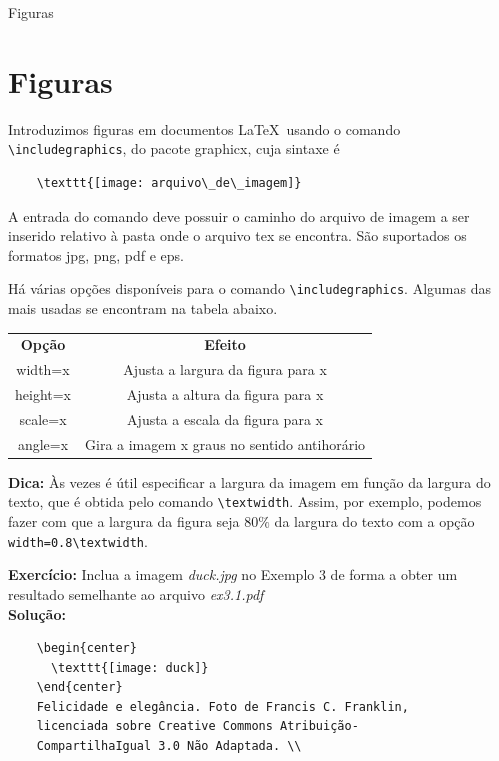 \documentclass[12pt]{beamer}
\begin{document}
\begin{frame}[fragile]{Figuras}
  \section{Figuras}
  Introduzimos figuras em documentos \LaTeX\ usando o comando \verb+\includegraphics+, do pacote graphicx, cuja sintaxe é
  \begin{verbatim}
    \texttt{[image: arquivo\_de\_imagem]}
  \end{verbatim}

  A entrada do comando deve possuir o caminho do arquivo de imagem a ser inserido relativo à pasta onde o arquivo tex se encontra. São suportados os formatos jpg, png, pdf e eps.

\end{frame}

\begin{frame}[fragile]
  Há várias opções disponíveis para o comando \verb+\includegraphics+. Algumas das mais usadas se encontram na tabela abaixo.
  \begin{center}
    \begin{tabular}{cc}
      \textbf{Opção} & \textbf{Efeito} \\
      width=x & Ajusta a largura da figura para x\\
      height=x & Ajusta a altura da figura para x\\
      scale=x & Ajusta a escala da figura para x\\
      angle=x & Gira a imagem x graus no sentido
      antihorário
    \end{tabular}
  \end{center}

  \textbf{Dica: } Às vezes é útil especificar a largura da imagem em função da largura do texto, que é obtida pelo comando \verb+\textwidth+. Assim, por exemplo, podemos fazer com que a largura da figura seja $80 \%$ da largura do texto com a opção \verb+width=0.8\textwidth+.
\end{frame}

\begin{frame}[fragile]

  \textbf{Exercício: } Inclua a imagem \emph{duck.jpg} no Exemplo 3 de forma a obter um resultado semelhante ao arquivo \emph{ex3.1.pdf}\\
  \bigskip
  \pause
  \textbf{Solução: }
  \begin{verbatim}
    \begin{center}
      \texttt{[image: duck]}
    \end{center}
    Felicidade e elegância. Foto de Francis C. Franklin,
    licenciada sobre Creative Commons Atribuição-
    CompartilhaIgual 3.0 Não Adaptada. \\
  \end{verbatim}

\end{frame}
\end{document}
